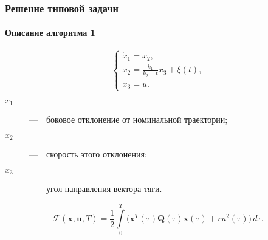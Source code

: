 \documentclass[ignorenonframetext,hyperref={pdftex,unicode},compress]{beamer}
\begin{document}
\begin{frame}
	\frametitle{Решение типовой задачи}
	\framesubtitle{Описание алгоритма 1}
    
    \begin{equation}\label{eq:16}
        \begin{cases}
            \dot{x}_1 = x_2 \text{,} \\
            \dot{x}_2 = \frac{k_1}{k_2 - t} x_3 + \xi(t) \text{,} \\
            \dot{x}_3 = u \text{.}
        \end{cases}
    \end{equation}

    \begin{description}
        \item[$x_1$] ---~~боковое отклонение от номинальной траектории;
        \item[$x_2$] ---~~скорость этого отклонения;
        \item[$x_3$] ---~~угол направления вектора тяги.
    \end{description}

    \begin{equation}\label{eq:17}
        \mathcal{F}(\mathbf{x}, \mathbf{u}, T) = \frac{1}{2} \int\limits_0^T \bigl( \mathbf{x}^T(\tau)\mathbf{Q}(\tau)\mathbf{x}(\tau) + ru^2(\tau) \bigr)\,d\tau \text{.}
    \end{equation}
\end{frame}
\end{document}
